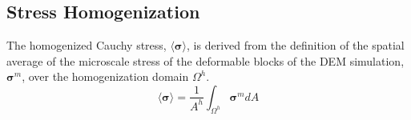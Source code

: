 





\subsection{Stress Homogenization}

The homogenized Cauchy stress, $\langle\boldsymbol{\sigma}\rangle$, is derived from the definition of the spatial average of the microscale stress of the deformable blocks of the DEM simulation, $\boldsymbol{\sigma}^m$, over the homogenization domain $\Omega^{h}$. 
\begin{equation}
\langle\boldsymbol{\sigma}\rangle=\frac{1}{A^{h}}\int_{\Omega^{h}}\boldsymbol{\sigma}^m dA\label{eqn:stress1}
\end{equation}


